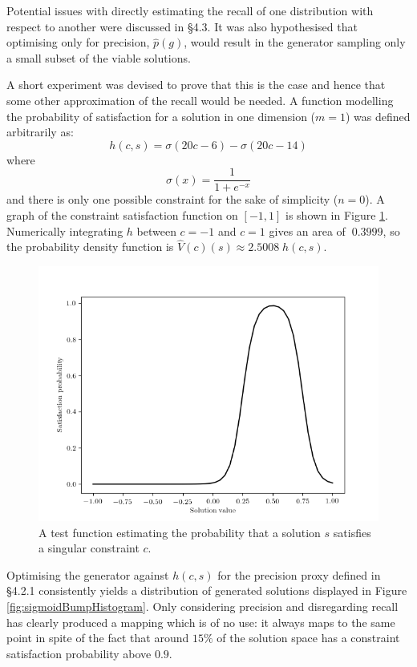 \documentclass[../../main.tex]{subfiles}
\begin{document}
Potential issues with directly estimating the recall of one distribution with respect to another were discussed in \S 4.3.
It was also hypothesised that optimising only for precision, $\hat{p}(g)$, would result in the generator sampling only a small subset of the viable solutions.

A short experiment was devised to prove that this is the case and hence that some other approximation of the recall would be needed.
A function modelling the probability of satisfaction for a solution in one dimension ($m=1$) was defined arbitrarily as:
$$h(c,s) = \sigma(20c - 6) - \sigma(20c - 14)$$
where
$$\sigma(x)=\frac{1}{1+e^{-x}}$$
and there is only one possible constraint for the sake of simplicity ($n=0$).
A graph of the constraint satisfaction function on $[-1, 1]$ is shown in Figure \ref{fig:sigmoidBumpFunction}.
Numerically integrating $h$ between $c=-1$ and $c=1$ gives an area of $~0.3999$, so the probability density function is $\hat{V}(c)(s) \approx 2.5008 \; h(c,s)$.
\begin{figure}[H]
    \begin{center}
    \includegraphics[width=\textwidth]{sigmoidBumpFunction}
    \caption{
        A test function estimating the probability that a solution $s$ satisfies a singular constraint $c$.
    }
    \label{fig:sigmoidBumpFunction}
    \end{center}
\end{figure}
Optimising the generator against $h(c, s)$ for the precision proxy defined in \S 4.2.1 consistently yields a distribution of generated solutions displayed in Figure \ref{fig:sigmoidBumpHistogram}.
Only considering precision and disregarding recall has clearly produced a mapping which is of no use: it always maps to the same point in spite of the fact that around $15\%$ of the solution space has a constraint satisfaction probability above $0.9$.
\end{document}
